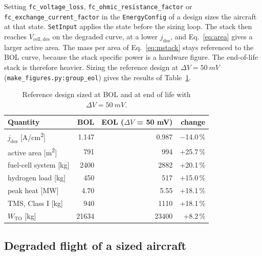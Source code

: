 \documentclass[a4paper,11pt]{article}
\newcommand{\code}[1]{\nolinkurl{#1}}
\newcommand{\fn}[1]{\nolinkurl{#1}}
\newcommand{\jdes}{j_\mathrm{des}}
\newcommand{\Vdes}{V_\mathrm{cell,des}}
\begin{document}
Setting \code{fc_voltage_loss}, \code{fc_ohmic_resistance_factor} or
\code{fc_exchange_current_factor} in the \code{EnergyConfig} of a design sizes the aircraft
at that state. \fn{SetInput} applies the state before the sizing loop. The stack then reaches
$\Vdes$ on the degraded curve, at a lower $\jdes$, and Eq.~\eqref{eq:area} gives a larger active
area. The mass per area of Eq.~\eqref{eq:mstack} stays referenced to the BOL curve, because the
stack specific power is a hardware figure. The end-of-life stack is therefore heavier. Sizing
the reference design at $\Delta V=\SI{50}{mV}$ (\fn{make_figures.py:group_eol}) gives the
results of Table~\ref{tab:eol}.

\begin{table}[ht]
\centering\small
\caption{Reference design sized at BOL and at end of life with $\Delta V=\SI{50}{mV}$.}
\label{tab:eol}
\begin{tabular}{@{}lrrr@{}}
\toprule
Quantity & BOL & EOL ($\Delta V$ = 50 mV) & change \\
\midrule
$\jdes$ [\si{A/cm^2}] & 1.147 & 0.987 & $-$14.0\,\% \\
active area [\si{m^2}] & 791 & 994 & +25.7\,\% \\
fuel-cell system [kg] & 2400 & 2882 & +20.1\,\% \\
hydrogen load [kg] & 450 & 517 & +15.0\,\% \\
peak heat [MW] & 4.70 & 5.55 & +18.1\,\% \\
TMS, Class I [kg] & 940 & 1110 & +18.1\,\% \\
$W_\mathrm{TO}$ [kg] & 21634 & 23400 & +8.2\,\% \\
\bottomrule
\end{tabular}
\end{table}

\subsection{Degraded flight of a sized aircraft}
\end{document}
